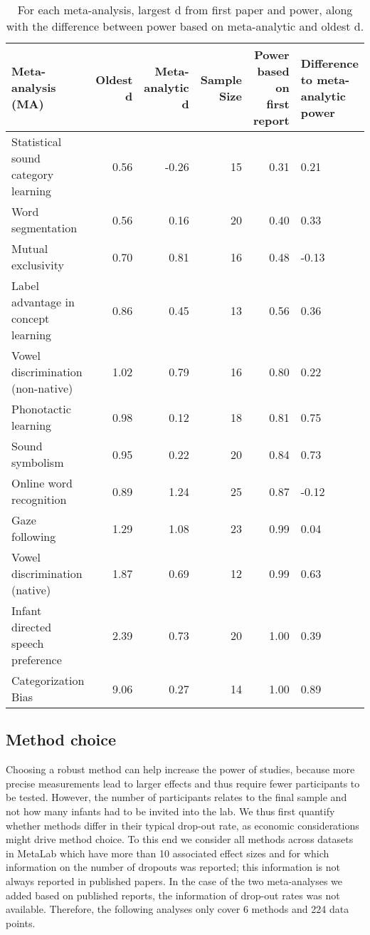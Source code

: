 \documentclass[english,floatsintext,man]{apa6}
\begin{document}
\begin{table}[tbp]
\begin{center}
\begin{threeparttable}
\caption{For each meta-analysis, largest d from first paper and power, along with the difference between power based on meta-analytic and oldest d.}
\begin{tabular}{lrrrrl}
\toprule
Meta-analysis (MA) & Oldest d & Meta-analytic d & Sample Size & Power based on 
 first report & Difference to
 meta-analytic power\\
\midrule
Statistical sound category learning & 0.56 & -0.26 & 15 & 0.31 & 0.21\\
Word segmentation & 0.56 & 0.16 & 20 & 0.40 & 0.33\\
Mutual exclusivity & 0.70 & 0.81 & 16 & 0.48 & -0.13\\
Label advantage in concept learning & 0.86 & 0.45 & 13 & 0.56 & 0.36\\
Vowel discrimination (non-native) & 1.02 & 0.79 & 16 & 0.80 & 0.22\\
Phonotactic learning & 0.98 & 0.12 & 18 & 0.81 & 0.75\\
Sound symbolism & 0.95 & 0.22 & 20 & 0.84 & 0.73\\
Online word recognition & 0.89 & 1.24 & 25 & 0.87 & -0.12\\
Gaze following & 1.29 & 1.08 & 23 & 0.99 & 0.04\\
Vowel discrimination (native) & 1.87 & 0.69 & 12 & 0.99 & 0.63\\
Infant directed speech preference & 2.39 & 0.73 & 20 & 1.00 & 0.39\\
Categorization Bias & 9.06 & 0.27 & 14 & 1.00 & 0.89\\
\bottomrule
\end{tabular}
\end{threeparttable}
\end{center}
\end{table}

\subsection{Method choice}\label{method-choice-1}

Choosing a robust method can help increase the power of studies, because
more precise measurements lead to larger effects and thus require fewer
participants to be tested. However, the number of participants relates
to the final sample and not how many infants had to be invited into the
lab. We thus first quantify whether methods differ in their typical
drop-out rate, as economic considerations might drive method choice. To
this end we consider all methods across datasets in MetaLab which have
more than 10 associated effect sizes and for which information on the
number of dropouts was reported; this information is not always reported
in published papers. In the case of the two meta-analyses we added based
on published reports, the information of drop-out rates was not
available. Therefore, the following analyses only cover 6 methods and
224 data points.
\end{document}
